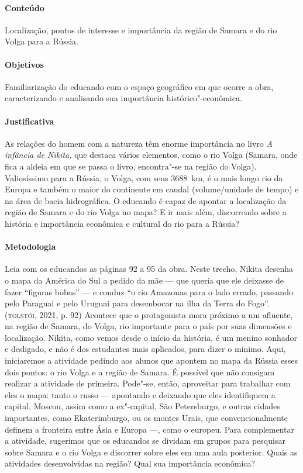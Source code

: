 \documentclass[11pt]{extarticle}
\begin{document}
\paragraph{Conteúdo}
Localização, pontos de interesse e importância da região de Samara e do
rio Volga para a Rússia.

\paragraph{Objetivos}
Familiarização do educando com o espaço geográfico em que ocorre a obra,
caracterizando e analisando sua importância histórico"-econômica.

\paragraph{Justificativa}
As relações do homem com a natureza têm enorme importância no livro
\emph{A infância de Nikita,} que destaca vários elementos, como o rio
Volga (Samara, onde fica a aldeia em que se passa o livro, encontra"-se na
região do Volga). Valiosíssimo para a Rússia, o Volga, com seus 3688~km,
é o mais longo rio da Europa e também o maior do
continente em caudal (volume/unidade de tempo) e na área de bacia
hidrográfica. O educando é capaz de apontar a localização da região de
Samara e do rio Volga no mapa? E ir mais além, discorrendo sobre a
história e importância econômica e cultural do rio para a Rússia?


\paragraph{Metodologia}
Leia com os educandos as páginas 92 a 95 da obra. Neste trecho, Nikita
desenha o mapa da América do Sul a pedido da mãe --- que queria que ele
deixasse de fazer ``figuras bobas'' --- e conduz ``o rio Amazonas para o
lado errado, passando pelo Paraguai e pelo Uruguai para desembocar na
ilha da Terra do Fogo''. (\textsc{tolstói}, 2021, p. 92) Acontece que o protagonista mora
próximo a um afluente, na região de Samara, do Volga, rio
importante para o país por suas dimensões e localização. Nikita,
como vemos desde o início da história, é um menino sonhador e desligado,
e não é dos estudantes mais aplicados, para dizer o mínimo. Aqui,
iniciaremos a atividade pedindo aos alunos que apontem no mapa da Rússia
esses dois pontos: o rio Volga e a região de Samara. É possível que não
consigam realizar a atividade de primeira. Pode"-se, então, aproveitar
para trabalhar com eles o mapa: tanto o russo --- apontando e deixando
que eles identifiquem a capital, Moscou, assim como a ex"-capital, São
Petersburgo, e outras cidades importantes, como Ekaterimburgo, ou os
montes Urais, que convencionalmente definem a fronteira entre Ásia e
Europa ---, como o europeu. Para complementar a atividade, sugerimos que
os educandos se dividam em grupos para pesquisar sobre Samara e o rio
Volga e discorrer sobre eles em uma aula posterior. Quais as atividades
desenvolvidas na região? Qual sua importância econômica?
\end{document}
